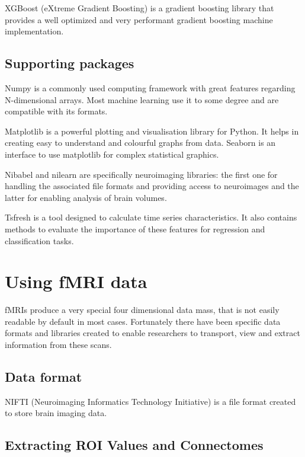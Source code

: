	XGBoost (eXtreme Gradient Boosting) is a gradient boosting library that provides a well optimized and very performant gradient boosting machine implementation.
	
	
	\subsection{Supporting packages}
	Numpy is a commonly used computing framework with great features regarding N-dimensional arrays. Most machine learning use it to some degree and are compatible with its formats.
	
	Matplotlib is a powerful plotting and visualisation library for Python. It helps in creating easy to understand and colourful graphs from data. Seaborn is an interface to use matplotlib for complex statistical graphics.
	
	Nibabel and nilearn are specifically neuroimaging libraries: the first one for handling the associated file formats and providing access to neuroimages and the latter for enabling analysis of brain volumes.
	
	Tsfresh is a tool designed to calculate time series characteristics. It also contains methods to evaluate the importance of these features for regression and classification tasks.
	
	
\section{Using fMRI data}

	fMRIs produce a very special four dimensional data mass, that is not easily readable by default in most cases. Fortunately there have been specific data formats and libraries created to enable researchers to transport, view and extract information from these scans.

	\subsection{Data format}
	
	NIFTI (Neuroimaging Informatics Technology Initiative) is a file format created to store brain imaging data. 
	
	
	\subsection{Extracting ROI Values and Connectomes}